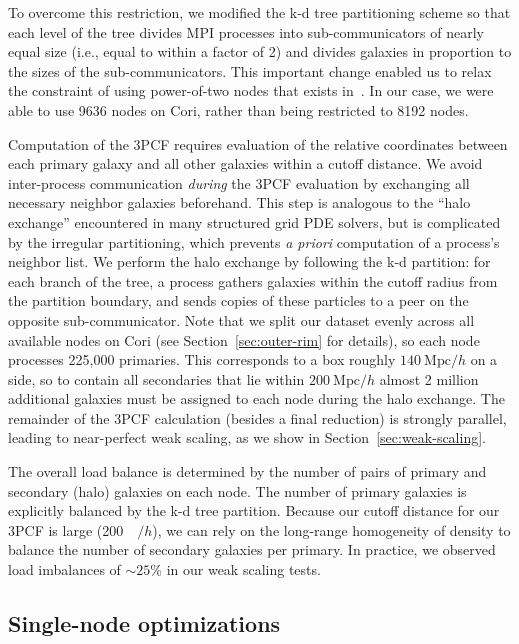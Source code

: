 To overcome this restriction, we modified the k-d tree partitioning scheme so that each level of the tree divides MPI processes into sub-communicators of nearly equal size (i.e., equal to within a factor of 2) and divides galaxies in proportion to the sizes of the sub-communicators.
This important change enabled us to relax the constraint of using power-of-two nodes that exists in~\cite{patwary2015bd}. 
In our case, we were able to use 9636 nodes on Cori, rather than being restricted to 8192 nodes. 


Computation of the 3PCF requires evaluation of the relative coordinates between each primary galaxy and all other galaxies within a cutoff distance.
We avoid inter-process communication \emph{ during} the 3PCF evaluation by exchanging all necessary neighbor galaxies beforehand.
This step is analogous to the ``halo exchange'' encountered in many structured grid PDE solvers, but is complicated by the irregular partitioning, which prevents \textit{a priori} computation of a process's neighbor list.
We perform the halo exchange by following the k-d partition: for each branch of the tree, a process gathers galaxies within the cutoff radius from the partition boundary, and sends copies of these particles to a peer on the opposite sub-communicator. 
Note that we split our dataset evenly across all available nodes on Cori (see Section~\ref{sec:outer-rim} for details), so each node processes 225,000 primaries. This corresponds to a box roughly $140~\text{Mpc}/h$ on a side, so to contain all secondaries that lie within $200~\text{Mpc}/h$ almost 2 million additional galaxies must be assigned to each node during the halo exchange.  
The remainder of the 3PCF calculation (besides a final reduction) is strongly parallel, leading to near-perfect weak scaling, as we show in Section~\ref{sec:weak-scaling}.


The overall load balance is determined by the number of pairs of primary and secondary (halo) galaxies on each node.
The number of primary galaxies is explicitly balanced by the k-d tree partition.
Because our cutoff distance for our 3PCF is large (\num{200}~\si{\mega\parsec}$/h$), we can rely on the long-range homogeneity of density to balance the number of secondary galaxies per primary.
In practice, we observed load imbalances of $\sim\!25$\% in our weak scaling tests.


\subsection{Single-node optimizations}  
\label{subsec:single-node-optimizations}

